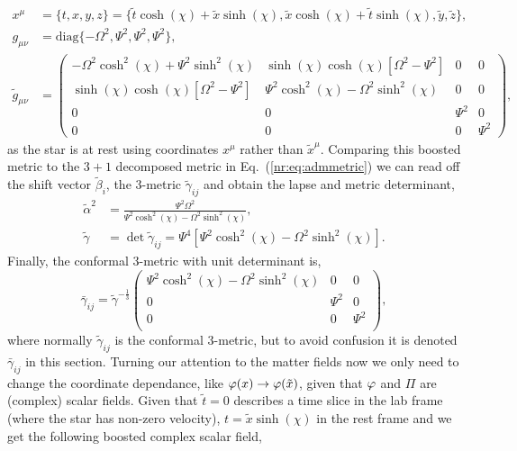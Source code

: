 \begin{align}
 x^\mu &= \{ t,x,y,z\} = \{\tilde{t}\cosh(\chi) + \tilde{x} \sinh(\chi),\tilde{x}\cosh(\chi)+\tilde{t}\sinh(\chi),\tilde{y},\tilde{z}\} ,\\
 g_{\mu\nu} &= \mathrm{diag} \{ -\Omega^2, \Psi^2,  \Psi^2, \Psi^2\} ,\\
 \tilde{g}_{\mu\nu}&=\begin{pmatrix} -\Omega^2\cosh^2 (\chi) + \Psi^2 \sinh^2 (\chi) & \sinh(\chi)\cosh(\chi)\left[\Omega^2-\Psi^2\right] & 0& 0 \\  \sinh(\chi)\cosh(\chi)\left[\Omega^2-\Psi^2\right] & \Psi^2 \cosh^2 (\chi) - \Omega^2 \sinh^2 (\chi) & 0 & 0\\ 0 & 0&\Psi^2&0 \\ 0&0&0&\Psi^2\end{pmatrix},
 \end{align}
 as the star is at rest using coordinates $x^\mu$ rather than $\tilde{x}^\mu$.
Comparing this boosted metric to the $3+1$ decomposed metric in Eq.~(\ref{nr:eq:admmetric}) we can read off the shift vector $\tilde{\beta}_i$, the 3-metric $\tilde{\gamma}_{ij}$ and obtain the lapse and metric determinant,
\begin{align} 
\tilde{\alpha}^2 &= \frac{\Psi ^2 \Omega ^2}{\Psi ^2 \cosh ^2(\chi) -\Omega ^2 \sinh ^2(\chi) },\\ 
\tilde{\gamma} &= \det \tilde{\gamma}_{ij} = \Psi^4\left[ \Psi^2 \cosh^2 (\chi) - \Omega^2 \sinh^2(\chi)\right].
\end{align}
Finally, the conformal 3-metric with unit determinant is, 
\begin{equation} \bar{\gamma}_{ij} = \tilde{\gamma}^{-\frac{1}{3}}\left(
\begin{array}{ccc}
 \Psi ^2 \cosh ^2(\chi) -\Omega ^2 \sinh ^2(\chi)  & 0 & 0 \\
 0 & \Psi ^2 & 0 \\
 0 & 0 & \Psi ^2 \\
\end{array}
\right),\end{equation}
where normally $\tilde{\gamma}_{ij}$ is the conformal 3-metric, but to avoid confusion it is denoted $\bar{\gamma}_{ij}$ in this section. Turning our attention to the matter fields now we only need to change the coordinate dependance, like $\varphi(x)\rightarrow \varphi(\tilde{x})$, given that $\varphi$ and $\Pi$ are (complex) scalar fields. Given that $\tilde{t}=0$ describes a time slice in the lab frame (where the star has non-zero velocity), $t = \tilde{x}\sinh(\chi)$ in the rest frame and we get the following boosted complex scalar field,
